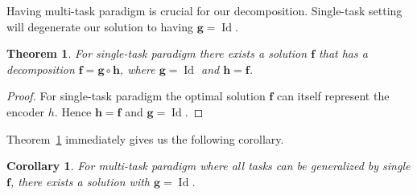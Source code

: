 \documentclass{article}
\newtheorem{theorem}{Theorem}[section]
\newtheorem{corollary}{Corollary}[theorem]
\begin{document}
        Having multi-task paradigm is crucial for our decomposition. Single-task setting will degenerate our solution to having \(\mathbf{g}=\operatorname{Id}\). 
        \begin{theorem}\label{single_task}
            For single-task paradigm there exists a solution \(\mathbf{f}\) that has a decomposition \(\mathbf{f} = \mathbf{g} \circ \mathbf{h}\), where \(\mathbf{g} = \operatorname{Id}\) and \(\mathbf{h} = \mathbf{f}\).
        \end{theorem}
        \begin{proof}
            For single-task paradigm the optimal solution \(\mathbf{f}\) can itself represent the encoder \(h\). Hence \(\mathbf{h} = \mathbf{f}\) and \(\mathbf{g}=\operatorname{Id}\).
        \end{proof}
        Theorem~\ref{single_task} immediately gives us the following corollary.
        \begin{corollary}
            For multi-task paradigm where all tasks can be generalized by single \(\mathbf{f}\), there exists a solution with \(\mathbf{g}=\operatorname{Id}\).
        \end{corollary}
\end{document}
